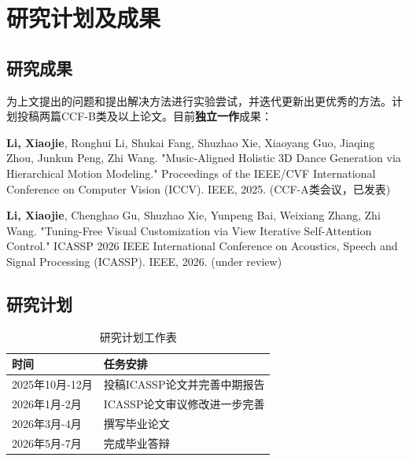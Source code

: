 \chapter{研究计划及成果}
\section{研究成果}
为上文提出的问题和提出解决方法进行实验尝试，并迭代更新出更优秀的方法。计划投稿两篇CCF-B类及以上论文。目前\textbf{独立一作}成果：

\textbf{Li, Xiaojie}, Ronghui Li, Shukai Fang, Shuzhao Xie, Xiaoyang Guo, Jiaqing Zhou, Junkun Peng, Zhi Wang. "Music-Aligned Holistic 3D Dance Generation via Hierarchical Motion Modeling." Proceedings of the IEEE/CVF International Conference on Computer Vision (ICCV). IEEE, 2025. (CCF-A类会议，已发表)

\textbf{Li, Xiaojie}, Chenghao Gu, Shuzhao Xie, Yunpeng Bai, Weixiang Zhang, Zhi Wang. "Tuning-Free Visual Customization via View Iterative Self-Attention Control." ICASSP 2026 IEEE International Conference on Acoustics, Speech and Signal Processing (ICASSP). IEEE, 2026. (under review)

\section{研究计划}

\begin{table}
  \centering
  \caption{研究计划工作表}
  \begin{tabular}{ll}
    \toprule
    时间          & 任务安排                         \\
    \midrule
    2025年10月-12月  & 投稿ICASSP论文并完善中期报告\\
    2026年1月-2月   & ICASSP论文审议修改进一步完善 \\
    2026年3月-4月  & 撰写毕业论文   \\
    2026年5月-7月  & 完成毕业答辩    \\
    \bottomrule
  \end{tabular}
  \label{tab:7}
\end{table}
